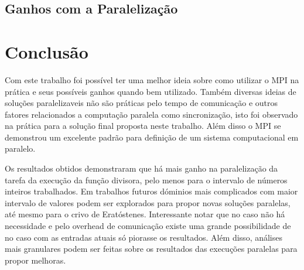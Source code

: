 \documentclass{article}
\begin{document}
\subsection{Ganhos com a Paralelização}


\section{Conclusão}

Com este trabalho foi possível ter uma melhor ideia sobre como utilizar o MPI na prática e seus possíveis ganhos quando bem utilizado. Também diversas ideias de soluções paralelizaveis não são práticas pelo tempo de comunicação e outros fatores relacionados a computação paralela como sincronização, isto foi observado na prática para a solução final proposta neste trabalho. Além disso o MPI se demonstrou um excelente padrão para definição de um sistema computacional em paralelo.

Os resultados obtidos demonstraram que há mais ganho na paralelização da tarefa da execução da função divisora, pelo menos para o intervalo de números inteiros trabalhados. Em trabalhos futuros dóminios mais complicados com maior intervalo de valores podem ser explorados para propor novas soluções paralelas, até mesmo para o crivo de Eratóstenes. Interessante notar que no caso não há necessidade e pelo overhead de comunicação existe uma grande possibilidade de no caso com as entradas atuais só piorasse os resultados. Além disso, análises mais granulares podem ser feitas sobre os  resultados das execuções paralelas para propor melhoras.



\end{document}
